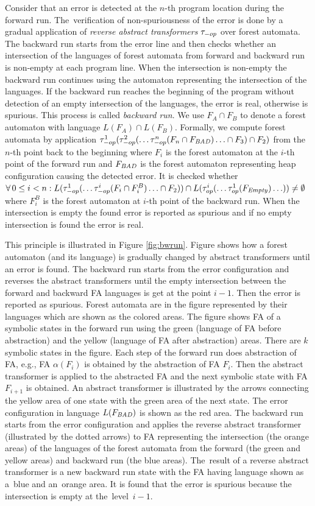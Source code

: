 Consider that an error is detected at the $n$-th program location
during the forward run.
The~verification of non-spuriousness of the error is done by a gradual application of
\emph{reverse abstract transformers} $\tau_{-op}$ over forest automata.
The backward run starts from the error line and
then checks whether an intersection of
the languages of forest automata from forward and backward run is non-empty
at each program line.
When the intersection is non-empty the backward run continues using the automaton
representing the intersection of the languages.
If the backward run reaches the beginning of the program without detection of
an empty intersection of the languages, the error is real, otherwise
is spurious.
This process is called \emph{backward run}.
We use $F_A \cap F_B$ to denote a forest automaton with language $L(F_A) \cap L(F_B)$.
Formally, we compute forest automata by application
$\tau_{-op}^1(\tau_{-op}^{2}(\ldots \tau_{-op}^{n}(F_{n} \cap F_\mathit{BAD}) \ldots \cap F_{3}) \cap F_{2})$
from the $n$-th point back to the beginning
where $F_i$ is the forest automaton at the $i$-th point of the forward run
and $F_\mathit{BAD}$ is the forest automaton representing heap configuration causing the detected error.
It is checked whether $\forall\,0 \leq i < n: L(\tau_{-op}^1(\ldots \tau_{-op}^{i}(F_{i} \cap F^B_{i}) \ldots \cap F_2)) \cap
L(\tau_{op}^i(\ldots \tau_{op}^{1}(F_\mathit{Empty}) \ldots)) \neq \emptyset$
where $F_i^B$ is the forest automaton at $i$-th point of the backward run.
When the intersection is empty the found error is reported as spurious
and if no empty intersection is found the error is real.

This principle is illustrated in Figure \ref{fig:bwrun}.
Figure shows how a forest automaton (and its language) is gradually changed
by abstract transformers until an error is found.
The backward run starts from the error configuration and reverses the abstract transformers
until the empty intersection between the forward and backward FA languages
is get at the point $i-1$.
Then the error is reported as spurious.
Forest automata are in the figure represented by their languages
which are shown as the colored areas.
The figure shows FA of a symbolic states in the forward run using the green (language of
FA before abstraction) and the yellow (language of FA after abstraction) areas.
There are $k$ symbolic states in the figure.
Each step of the forward run does abstraction of FA,
e.g., FA $\alpha(F_{i})$ is obtained by the abstraction of FA $F_i$.
Then the abstract transformer is applied to the abstracted FA
and the next symbolic state with FA $F_{i+1}$ is obtained.
An abstract transformer is illustrated by the arrows connecting
the yellow area of one state with the green area of the next state.
The error configuration in language $L(F_\mathit{BAD})$ is shown as the red area.
The backward run starts from the error configuration and applies the reverse abstract transformer
(illustrated by the dotted arrows) to FA representing the intersection
(the orange areas) of the languages of the forest automata
from the forward (the green and yellow areas) and backward run (the blue areas).
The~result of a reverse abstract transformer is a new backward run state
with the FA having language shown as a~blue and an~orange area.
It is found that the error is spurious because the intersection
is empty at the~level~$i-1$.


